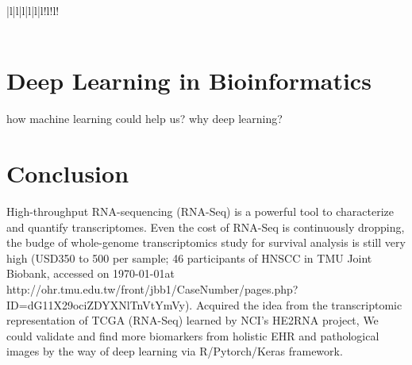 \documentclass[12pt, a4paper]{article}
\begin{document}
\begin{table}[!hp]
{\begin{tabular}{|l|l|l|l|l|l!{\color{black}\vrule}l!{\color{black}\vrule}l!{\color{black}\vrule}}
                                                                                                                                                                                                                                                                                                                                                                                                                                                                                                \\ 
\hline
{}                                                                                                                                                                                                                                                                                                                                                                                                    \\
\hline
\end{tabular}
}%
{}
\label{table:table4}
\end{table}










\clearpage

\section{Deep Learning in Bioinformatics}

how machine learning could help us?
why deep learning?

\section{Conclusion}
High-throughput RNA-sequencing (RNA-Seq) is a powerful tool to characterize and quantify transcriptomes. Even the cost of RNA-Seq is continuously dropping, 
the budge of whole-genome transcriptomics study for survival analysis is still very high (USD350 to 500 per sample; 46 participants of HNSCC in TMU Joint Biobank, accessed on \today at http://ohr.tmu.edu.tw/front/jbb1/CaseNumber/pages.php?ID=dG11X29ociZDYXNlTnVtYmVy).
Acquired the idea from the transcriptomic representation of TCGA (RNA-Seq) learned by NCI's HE2RNA project\citep{Schmauch2020},
We could validate and find more biomarkers from holistic EHR and pathological images by the way of deep learning via R/Pytorch/Keras framework.
\end{document}

